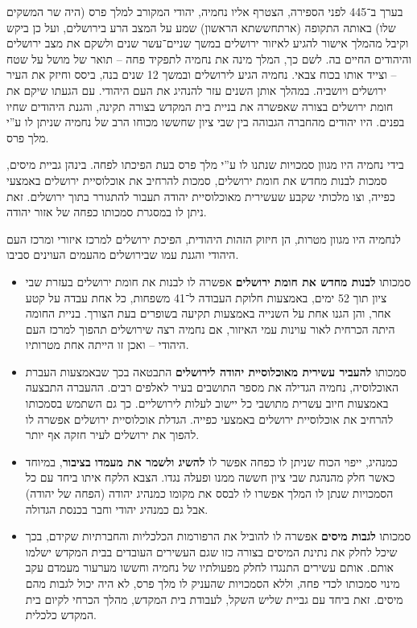 \documentclass[]{article}
\begin{document}
\begin{enumerate}[A.]
        בערך ב־445 לפני הספירה, הצטרף אליו נחמיה, יהודי המקורב למלך פרס (היה שר המשקים שלו) באותה התקופה (ארתחששתא הראשון) שמע על המצב הרע בירושלים, ועל כן ביקש וקיבל מהמלך אישור להגיע לאיזור ירושלים במשך שניים־עשר שנים ולשקם את מצב ירושלים והיהודים החיים בה. לשם כך, המלך מינה את נחמיה לתפקיד פחה – תואר של מושל על שטח – וצייד אותו בכוח צבאי. נחמיה הגיע לירושלים ובמשך 12 שנים בנה, ביסס וחיזק את העיר ירושלים ויושביה. במהלך אותן השנים עזר להנהיג את העם היהודי. עם הגעתו שיקם את חומת ירושלים בצורה שאפשרה את בניית בית המקדש בצורה תקינה, והגנת היהודים שחיו בפנים. היו יהודים מהחברה הגבוהה בין שבי ציון שחששו מכוחו הרב של נחמיה שניתן לו ע''י מלך פרס. 
        
        בידי נחמיה היו מגוון סמכויות שנתנו לו ע''י מלך פרס בעת הפיכתו לפחה. בינהן גביית מיסים, סמכות לבנות מחדש את חומת ירושלים, סמכות להרחיב את אוכלוסיית ירושלים באמצעי כפייה, וצו מלכותי שקבע שעשירית מאוכלוסיית יהודה תעבור להתגורר בתוך ירושלים. זאת ניתן לו במסגרת סמכותו כפחה של אזור יהודה. 
        
        לנחמיה היו מגוון מטרות, הן חיזוק הזהות היהודית, הפיכת ירושלים למרכז איזורי ומרכז העם היהודי והגנת עמו שבירושלים מהעמים העוינים סביבו. 
        
        \begin{itemize}
            \item סמכותו \textbf{לבנות מחדש את חומת ירושלים} אפשרה לו לבנות את חומת ירושלים בעזרת שבי ציון תוך 52 ימים, באמצעות חלוקת העבודה ל־41 משפחות, כל אחת עבדה על קטע אחר, והן הגנו אחת על השנייה באמצעות תקיעה בשופרים בעת הצורך. בניית החומה היתה הכרחית לאור עוינות עמי האיזור, אם נחמיה רצה שירושלים תהפוך למרכז העם היהודי – ואכן זו הייתה אחת מטרותיו. 
            
            \item סמכותו \textbf{להעביר עשירית מאוכלוסיית יהודה לירושלים} התבטאה בכך שבאמצעות העברת האוכלוסיה, נחמיה הגדילה את מספר התושבים בעיר לאלפים רבים. ההעברה התבצעה באמצעות חיוב עשרית מתושבי כל יישוב לעלות לירושליים. כך גם השתמש בסמכותו להרחיב את אוכלוסיית ירושלים באמצעי כפייה. הגדלת אוכלוסיית ירושלים אפשרה לו להפוך את ירושלים לעיר חזקה אף יותר. 
            
            \item כמנהיג, ייפוי הכוח שניתן לו כפחה אפשר לו \textbf{להשיג ולשמר את מעמדו בציבור}, במיוחד כאשר חלק מהנהגת שבי ציון חששה ממנו ופעלה נגדו. הצבא הלקח איתו ביחד עם כל הסמכויות שנתן לו המלך אפשרו לו לבסס את מקומו כמנהיג יהודה (הפחה של יהודה) אבל גם כמנהיג יהודי וחבר בכנסת הגדולה. 
            
            \item סמכותו \textbf{לגבות מיסים} אפשרה לו להוביל את הרפורמות הכלכליות והחברתיות שקידם, בכך שיכל לחלק את נתינת המיסים בצורה כזו שגם העשירים העובדים בבית המקדש ישלמו אותם. אותם עשירים התנגדו לחלק מפעולתיו של נחמיה וחששו מערעור מעמדם עקב מינוי סמכותו לכדי פחה, וללא הסמכויות שהעניק לו מלך פרס, לא היה יכול לגבות מהם מיסים. זאת ביחד עם גביית שליש השקל, לעבודת בית המקדש, מהלך הכרחי לקיום בית המקדש כלכלית. 
        \end{itemize}
        

\end{enumerate}
\end{document}
